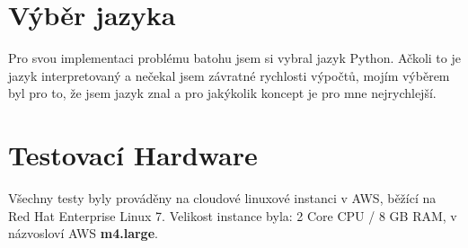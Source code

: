 \documentclass[a4paper,10pt,twocolumn]{article}
\begin{document}
\begin{abstract}
\end{abstract}

\section{Výběr jazyka}
Pro svou implementaci problému batohu jsem si vybral jazyk Python. Ačkoli to je jazyk interpretovaný a nečekal jsem závratné rychlosti výpočtů, mojím výběrem byl pro to, že jsem jazyk znal a pro jakýkolik koncept je pro mne nejrychlejší.






\section{Testovací Hardware}
Všechny testy byly prováděny na cloudové linuxové instanci v AWS, běžící na Red Hat Enterprise Linux 7. Velikost instance byla:
  2 Core CPU / 8 GB RAM, v názvosloví AWS \textbf{m4.large}.
\end{document}
